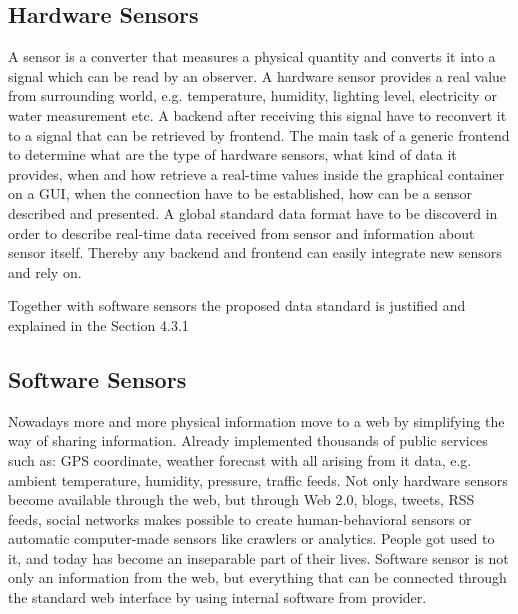 	\subsection {Hardware Sensors}
	A sensor is a converter that measures a physical quantity and converts it into a signal which can be read by an observer. A hardware sensor provides a real value from surrounding world, e.g. temperature, humidity, lighting level,  electricity or water measurement etc. A backend after receiving this signal have to reconvert it to a signal that can be retrieved by frontend. The main task of a generic frontend to determine what are the type of hardware sensors, what kind of data it provides, when and how retrieve a real-time values inside the graphical container on a GUI, when the connection have to be established, how can be a sensor described and presented. A global standard data format have to be discoverd in order to describe real-time data received from sensor and information about sensor itself. Thereby any backend and frontend can easily integrate new sensors and rely on.

    Together with software sensors the proposed data standard is justified and explained in the Section 4.3.1

	\subsection {Software Sensors}
	Nowadays more and more physical information move to a web by simplifying the way of sharing information. Already implemented thousands of public services such as: GPS coordinate, weather forecast with all arising from it data, e.g. ambient temperature, humidity, pressure, traffic feeds. Not only hardware sensors become available through the web, but through Web 2.0, blogs, tweets, RSS feeds, social networks makes possible to create human-behavioral sensors or automatic computer-made sensors like crawlers or analytics. People got used to it, and today has become an inseparable part of their lives. Software sensor is not only an information from the web, but everything that can be connected through the standard web interface by using internal software from provider.
	
